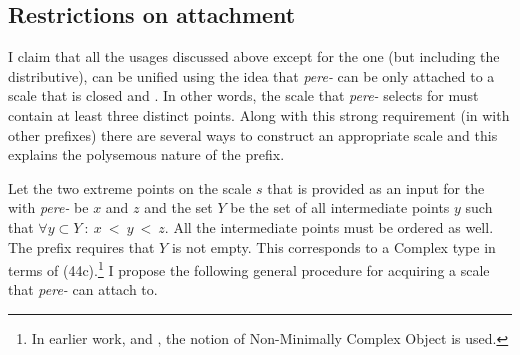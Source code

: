 \subsection{Restrictions on attachment}
I claim that all the usages discussed above except for the  one (but including the distributive), can be unified using the idea that \textit{pere-} can be only attached to a scale that is closed and . In other words, the scale that \textit{pere-} selects for must contain at least three distinct points. Along with this strong requirement (in  with other prefixes) there are several ways to construct an appropriate scale and this explains the polysemous nature of the prefix. 

Let the two extreme points on the scale $s$ that is provided as an input for the  with \textit{pere-} be $x$ and $z$ and the set $Y$ be the set of all intermediate points $y$ such that $\forall y \subset Y~:~x~<~y~<~z$. All the intermediate points must be ordered as well. The prefix requires that $Y$ is not empty. This corresponds to a Complex type in terms of \citealt{Beavers:12} (44c).\footnote{In earlier work, \citealt{Beavers:02} and \citealt{Beavers:08}, the notion of Non-Minimally Complex Object is used.} I propose the following general procedure for acquiring a scale that \textit{pere-} can attach to. 
